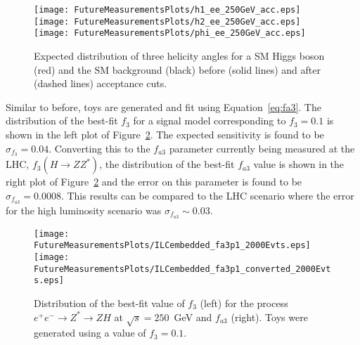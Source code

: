 \begin{figure}
\begin{center}
\texttt{[image: FutureMeasurementsPlots/h1\_ee\_250GeV\_acc.eps]}
\texttt{[image: FutureMeasurementsPlots/h2\_ee\_250GeV\_acc.eps]}
\texttt{[image: FutureMeasurementsPlots/phi\_ee\_250GeV\_acc.eps]}
\end{center}
\caption{Expected distribution of three helicity angles for
a SM Higgs boson (red) and the SM background (black) before
(solid lines) and after (dashed lines) acceptance cuts.}
\label{fig:ILCanglesWithAccep}
\end{figure}

Similar to before, toys are generated
and fit using Equation~\ref{eq:fa3}.  The distribution of
the best-fit $f_3$ for a signal model corresponding to $f_3=0.1$
is shown in the left plot of Figure~\ref{fig:ILCsensitivity}.  
The expected sensitivity is found to be 
$\sigma_{f_3}=0.04$.  Converting this to the $f_{a3}$ parameter
currently being measured at the LHC, $f_3(H\to ZZ^*)$,
the distribution of the best-fit $f_{a3}$ value is shown in 
the right plot of 
Figure~\ref{fig:ILCsensitivity} and the error on this parameter
is found to be $\sigma_{f_{a3}}=0.0008$.  This results can be
compared to the LHC scenario where the error for the high 
luminosity scenario was $\sigma_{f_{a3}}\sim0.03$.  


\begin{figure}
\begin{center}
\texttt{[image: FutureMeasurementsPlots/ILCembedded\_fa3p1\_2000Evts.eps]}
\texttt{[image: FutureMeasurementsPlots/ILCembedded\_fa3p1\_converted\_2000Evts.eps]}
\caption{Distribution of the best-fit value of $f_3$ (left) for
the process $e^+e^-\to Z^*\to ZH$ at $\sqrt{s}=250$~GeV and $f_{a3}$
(right).  Toys were generated using a value of $f_3=0.1$.}
\label{fig:ILCsensitivity}
\end{center}
\end{figure}


